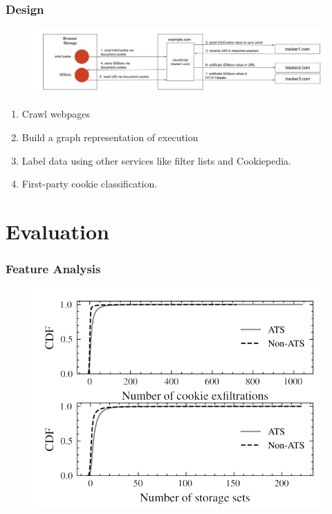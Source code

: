 \documentclass{beamer}
\begin{document}
\begin{frame}
\frametitle{Design}

\begin{figure}
\includegraphics[scale=0.2]{img/graphconstruction}
\end{figure}

\begin{enumerate}
\item Crawl webpages
\item Build a graph representation of execution
\item Label data using other services like filter lists and Cookiepedia.
\item First-party cookie classification.
\end{enumerate}

\end{frame}


\section{Evaluation}

\begin{frame}
\frametitle{Feature Analysis}


\begin{figure}
\includegraphics[scale=0.3]{img/featureanalysis}
\end{figure}

\end{frame}
\end{document}
